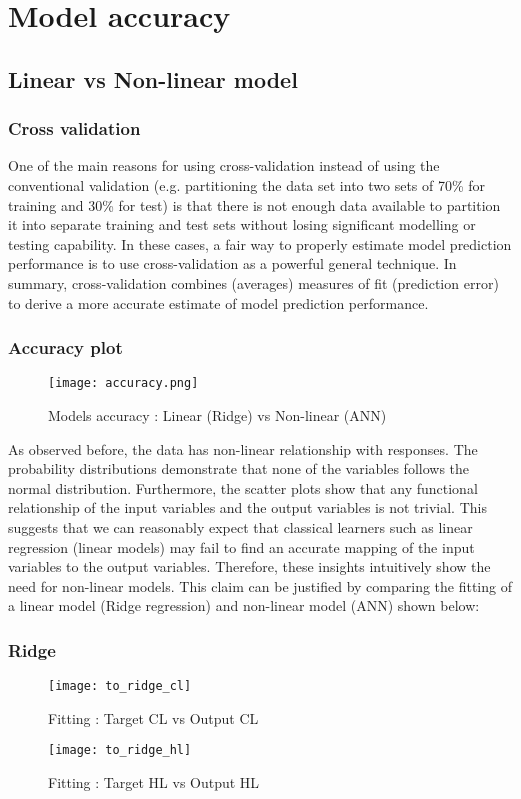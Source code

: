 \section{Model accuracy}
  \subsection{Linear vs Non-linear model}
  \subsubsection{Cross validation}
    One of the main reasons for using cross-validation instead of using the conventional validation (e.g. partitioning the data set into two sets of 70\% for training and 30\% for test) is that there is not enough data available to partition it into separate training and test sets without losing significant modelling or testing capability. In these cases, a fair way to properly estimate model prediction performance is to use cross-validation as a powerful general technique. In summary, cross-validation combines (averages) measures of fit (prediction error) to derive a more accurate estimate of model prediction performance.
  \subsubsection{Accuracy plot}
  \begin{figure}[h!]
      \centering
      \texttt{[image: accuracy.png]}
      \caption{Models accuracy : Linear (Ridge) vs Non-linear (ANN)}
      \label{fig:accuracy}                    
  \end{figure}
  \newpage
  As observed before, the data has non-linear relationship with responses. The probability distributions demonstrate that none of the variables follows the normal distribution. Furthermore, the scatter plots show that any functional relationship of the input variables and the output variables is not trivial. This suggests that we can reasonably expect that classical learners such as linear regression (linear models) may fail to find an accurate mapping of the input variables to the output variables. Therefore, these insights intuitively show the need for non-linear models. This claim can be justified by comparing the fitting of a linear model (Ridge regression) and non-linear model (ANN) shown below:

  \subsubsection{Ridge}
  \begin{figure}[h!]
      \centering
      \texttt{[image: to\_ridge\_cl]}
      \caption{Fitting : Target CL vs Output CL}
      \label{fig:to_ridge_cl}                    
  \end{figure}
  \begin{figure}[h!]
      \centering
      \texttt{[image: to\_ridge\_hl]}
      \caption{Fitting : Target HL vs Output HL}
      \label{fig:to_ridge_hl}                    
  \end{figure}
  \newpage

